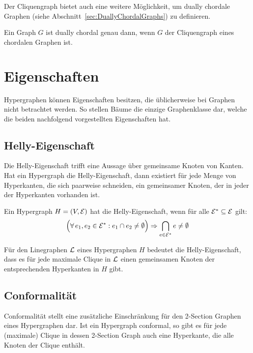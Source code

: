 Der Cliquengraph bietet auch eine weitere Möglichkeit, um dually chordale Graphen (siehe Abschnitt~\ref{sec:DuallyChordalGraphs}) zu definieren.

\begin{Theorem}\label{theo:CliqueChorDuallyChor}
    \cite{duallyChordal}
    Ein Graph $G$ ist dually chordal genau dann, wenn $G$ der Cliquengraph eines chordalen Graphen ist.
\end{Theorem}

\section{Eigenschaften}
Hypergraphen können Eigenschaften besitzen, die üblicherweise bei Graphen nicht betrachtet werden. So stellen Bäume die einzige Graphenklasse dar, welche die beiden nachfolgend vorgestellten Eigenschaften hat.

\subsection{Helly-Eigenschaft}
Die Helly-Eigenschaft trifft eine Aussage über gemeinsame Knoten von Kanten. Hat ein Hypergraph die Helly-Eigenschaft, dann existiert für jede Menge von Hyperkanten, die sich paarweise schneiden, ein gemeinsamer Knoten, der in jeder der Hyperkanten vorhanden ist.

\begin{mydef}\label{def:Helly}
    Ein Hypergraph $H=(V,\mathcal{E})$ hat die Helly-Eigenschaft, wenn für alle $\mathcal{E}^*\subseteq\mathcal{E}$ gilt:
    \[ \Big(\forall\,e_1,e_2 \in \mathcal{E}^*: e_1 \cap e_2 \neq \emptyset\Big) \Rightarrow \bigcap_{e \in \mathcal{E}^*}e \neq \emptyset \]
\end{mydef}

Für den Linegraphen $\mathcal{L}$ eines Hypergraphen $H$ bedeutet die Helly-Eigenschaft, dass es für jede maximale Clique in $\mathcal{L}$ einen gemeinsamen Knoten der entsprechenden Hyperkanten in $H$ gibt. 

\subsection{Conformalität}
Conformalität stellt eine zusätzliche Einschränkung für den 2-Section Graphen eines Hypergraphen dar. Ist ein Hypergraph conformal, so gibt es für jede (maximale) Clique in dessen 2-Section Graph auch eine Hyperkante, die alle Knoten der Clique enthält.

